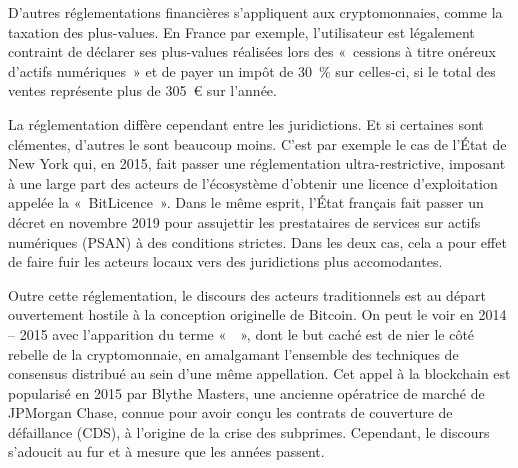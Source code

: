 D'autres réglementations financières s'appliquent aux cryptomonnaies, comme la taxation des plus-values. En France par exemple, l'utilisateur est légalement contraint de déclarer ses plus-values réalisées lors des «~cessions à titre onéreux d'actifs numériques~» et de payer un impôt de 30~\% sur celles-ci, si le total des ventes représente plus de 305~\euro{} sur l'année. %

La réglementation diffère cependant entre les juridictions. Et si certaines sont clémentes, d'autres le sont beaucoup moins. C'est par exemple le cas de l'État de New York qui, en 2015, fait passer une réglementation ultra-restrictive, imposant à une large part des acteurs de l'écosystème d'obtenir une licence d'exploitation appelée la «~BitLicence~». Dans le même esprit, l'État français fait passer un décret en novembre 2019 pour assujettir les prestataires de services sur actifs numériques (PSAN) à des conditions strictes. Dans les deux cas, cela a pour effet de faire fuir les acteurs locaux vers des juridictions plus accomodantes.

Outre cette réglementation, le discours des acteurs traditionnels est au départ ouvertement hostile à la conception originelle de Bitcoin. On peut le voir en 2014 -- 2015 avec l'apparition du terme «~~», dont le but caché est de nier le côté rebelle de la cryptomonnaie, en amalgamant l'ensemble des techniques de consensus distribué au sein d'une même appellation. Cet appel à la blockchain est popularisé en 2015 par Blythe Masters, une ancienne opératrice de marché de JPMorgan Chase, connue pour avoir conçu les contrats de couverture de défaillance (CDS), à l'origine de la crise des subprimes. Cependant, le discours s'adoucit au fur et à mesure que les années passent. %

